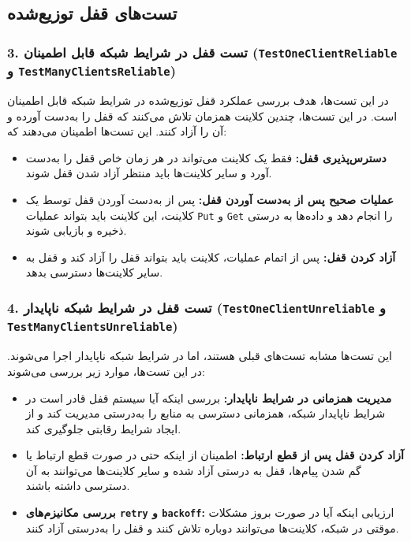 \subsection*{تست‌های قفل توزیع‌شده}

\subsubsection*{3. تست قفل در شرایط شبکه قابل اطمینان (\texttt{TestOneClientReliable} و \texttt{TestManyClientsReliable})}

در این تست‌ها، هدف بررسی عملکرد قفل توزیع‌شده در شرایط شبکه قابل اطمینان است. در این تست‌ها، چندین کلاینت همزمان تلاش می‌کنند که قفل را به‌دست آورده و آن را آزاد کنند. این تست‌ها اطمینان می‌دهند که:
\begin{itemize}
    \item \textbf{دسترس‌پذیری قفل:} فقط یک کلاینت می‌تواند در هر زمان خاص قفل را به‌دست آورد و سایر کلاینت‌ها باید منتظر آزاد شدن قفل شوند.
    \item \textbf{عملیات صحیح پس از به‌دست آوردن قفل:} پس از به‌دست آوردن قفل توسط یک کلاینت، این کلاینت باید بتواند عملیات \texttt{Put} و \texttt{Get} را انجام دهد و داده‌ها به درستی ذخیره و بازیابی شوند.
    \item \textbf{آزاد کردن قفل:} پس از اتمام عملیات، کلاینت باید بتواند قفل را آزاد کند و قفل به سایر کلاینت‌ها دسترسی بدهد.
\end{itemize}

\subsubsection*{4. تست قفل در شرایط شبکه ناپایدار (\texttt{TestOneClientUnreliable} و \texttt{TestManyClientsUnreliable})}

این تست‌ها مشابه تست‌های قبلی هستند، اما در شرایط شبکه ناپایدار اجرا می‌شوند. در این تست‌ها، موارد زیر بررسی می‌شوند:
\begin{itemize}
    \item \textbf{مدیریت همزمانی در شرایط ناپایدار:} بررسی اینکه آیا سیستم قفل قادر است در شرایط ناپایدار شبکه، همزمانی دسترسی به منابع را به‌درستی مدیریت کند و از ایجاد شرایط رقابتی جلوگیری کند.
    \item \textbf{آزاد کردن قفل پس از قطع ارتباط:} اطمینان از اینکه حتی در صورت قطع ارتباط یا گم شدن پیام‌ها، قفل به درستی آزاد شده و سایر کلاینت‌ها می‌توانند به آن دسترسی داشته باشند.
    \item \textbf{بررسی مکانیزم‌های \texttt{retry} و \texttt{backoff}:} ارزیابی اینکه آیا در صورت بروز مشکلات موقتی در شبکه، کلاینت‌ها می‌توانند دوباره تلاش کنند و قفل را به‌درستی آزاد کنند.
\end{itemize}

